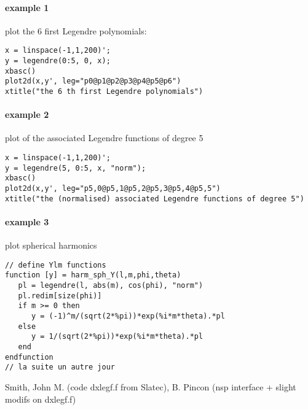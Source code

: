 \begin{examples}
\paragraph{example 1} plot the 6 first Legendre polynomials:
\begin{Verbatim}
x = linspace(-1,1,200)';
y = legendre(0:5, 0, x);
xbasc()
plot2d(x,y', leg="p0@p1@p2@p3@p4@p5@p6")
xtitle("the 6 th first Legendre polynomials")
\end{Verbatim}

\paragraph{example 2} plot of the associated Legendre functions of degree 5 
\begin{Verbatim}
x = linspace(-1,1,200)';
y = legendre(5, 0:5, x, "norm");
xbasc()
plot2d(x,y', leg="p5,0@p5,1@p5,2@p5,3@p5,4@p5,5")
xtitle("the (normalised) associated Legendre functions of degree 5")
\end{Verbatim}

\paragraph{example 3} plot spherical harmonics
\begin{Verbatim}
// define Ylm functions
function [y] = harm_sph_Y(l,m,phi,theta)
   pl = legendre(l, abs(m), cos(phi), "norm")
   pl.redim[size(phi)]
   if m >= 0 then
      y = (-1)^m/(sqrt(2*%pi))*exp(%i*m*theta).*pl
   else
      y = 1/(sqrt(2*%pi))*exp(%i*m*theta).*pl
   end      
endfunction
// la suite un autre jour
\end{Verbatim}

\end{examples}

\begin{authors}
Smith, John M. (code dxlegf.f from Slatec), B. Pincon (nsp interface + slight modifs on dxlegf.f) 
\end{authors}

